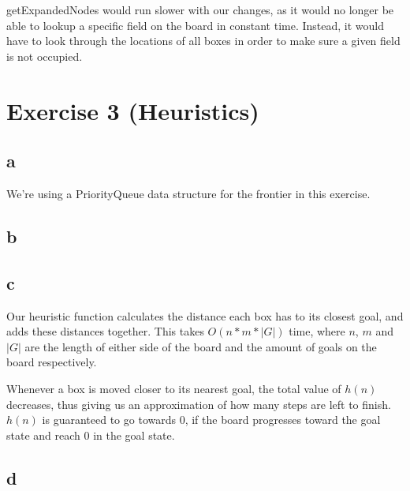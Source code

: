 \documentclass[12pt]{article}
\begin{document}
getExpandedNodes would run slower with our changes, as it would no longer be able to lookup a specific field on the board in constant time. Instead, it would have to look through the locations of all boxes in order to make sure a given field is not occupied.


\section{Exercise 3 (Heuristics)}
\label{sec:Exercise 3 (Heuristics)}

\subsection{a}
\label{sub:a}

We're using a PriorityQueue data structure for the frontier in this exercise.

\subsection{b}
\label{sub:b}


\subsection{c}
\label{sub:c}

Our heuristic function calculates the distance each box has to its closest goal, and adds these distances together. This takes $O(n*m*|G|)$ time, where $n$, $m$ and $|G|$ are the length of either side of the board and the amount of goals on the board respectively.

Whenever a box is moved closer to its nearest goal, the total value of $h(n)$ decreases, thus giving us an approximation of how many steps are left to finish. $h(n)$ is guaranteed to go towards 0, if the board progresses toward the goal state and reach 0 in the goal state.

\subsection{d}
\label{sub:d}
\end{document}
